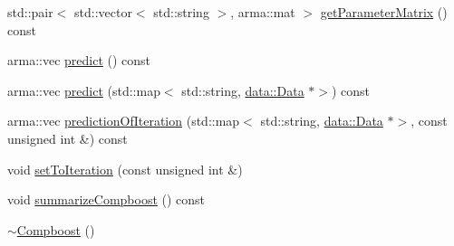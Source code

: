 \begin{DoxyCompactItemize}
\item 
std\+::pair$<$ std\+::vector$<$ std\+::string $>$, arma\+::mat $>$ \mbox{\hyperlink{classcboost_1_1_compboost_a1652d7fa10039beaee1998e640f1b68a}{get\+Parameter\+Matrix}} () const
\item 
arma\+::vec \mbox{\hyperlink{classcboost_1_1_compboost_a32d1066a24607ff6ef2f934002adf62b}{predict}} () const
\item 
arma\+::vec \mbox{\hyperlink{classcboost_1_1_compboost_a1779a0c89cf9da32b250c0c083631c58}{predict}} (std\+::map$<$ std\+::string, \mbox{\hyperlink{classdata_1_1_data}{data\+::\+Data}} $\ast$$>$) const
\item 
arma\+::vec \mbox{\hyperlink{classcboost_1_1_compboost_a6582a12bf1060750367219aeae395963}{prediction\+Of\+Iteration}} (std\+::map$<$ std\+::string, \mbox{\hyperlink{classdata_1_1_data}{data\+::\+Data}} $\ast$$>$, const unsigned int \&) const
\item 
void \mbox{\hyperlink{classcboost_1_1_compboost_ad1ee3b88f585f38255d827dceb4b7659}{set\+To\+Iteration}} (const unsigned int \&)
\item 
void \mbox{\hyperlink{classcboost_1_1_compboost_a7be8cb767054ece895d535c1f468233e}{summarize\+Compboost}} () const
\item 
\mbox{\hyperlink{classcboost_1_1_compboost_a3e23314cc3a1d31fc5df61e0a16c51e4}{$\sim$\+Compboost}} ()
\end{DoxyCompactItemize}
